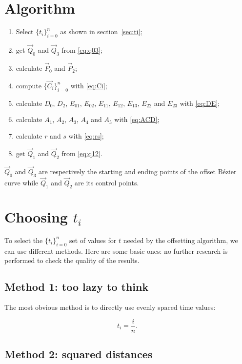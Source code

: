 \documentclass{scrartcl}
\newcommand\V[1]{\vec{#1}}
\begin{document}
\section{Algorithm}

\begin{enumerate}
    \item Select $\{t_i\}_{i=0}^n$ as shown in section~\ref{sec:ti};
    \item get $\V{Q}_0$ and $\V{Q}_3$ from \eqref{eq:q03};
    \item calculate $\V{P}_0$ and $\V{P}_2$;
    \item compute $\{\V{C}_i\}_{i=0}^n$ with \eqref{eq:Ci};
    \item calculate $D_0$, $D_2$, $E_{01}$, $E_{02}$, $E_{11}$,
	$E_{12}$, $E_{13}$, $E_{22}$ and $E_{23}$ with \eqref{eq:DE};
    \item calculate $A_1$, $A_2$, $A_3$, $A_4$ and $A_5$ with
	\eqref{eq:ACD};
    \item calculate $r$ and $s$ with \eqref{eq:rs};
    \item get $\V{Q}_1$ and $\V{Q}_2$ from \eqref{eq:q12}.
\end{enumerate}

$\V{Q}_0$ and $\V{Q}_3$ are respectively the starting and ending
points of the offset Bézier curve while $\V{Q}_1$ and $\V{Q}_2$ are
its control points.

\clearpage
\section{Choosing $t_i$\label{sec:ti}}

To select the $\{t_i\}_{i=0}^n$ set of values for $t$ needed by
the offsetting algorithm, we can use different methods. Here are some
basic ones: no further research is performed to check the quality of
the results.

\subsection{Method 1: too lazy to think}

The most obvious method is to directly use evenly spaced time values:

\begin{equation*}
    t_i = \frac{i}{n}.
\end{equation*}

\subsection{Method 2: squared distances}
\end{document}

